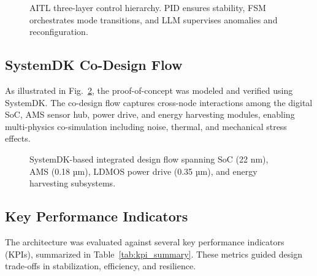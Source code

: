 \begin{figure}[t]
  \centering
  \resizebox{\columnwidth}{!}{}
  \caption{AITL three-layer control hierarchy. PID ensures stability, FSM orchestrates mode transitions, and LLM supervises anomalies and reconfiguration.}
  \label{fig:aitl_layers}
\end{figure}

\subsection{SystemDK Co-Design Flow}
As illustrated in Fig.~\ref{fig:systemdk_flow}, the proof-of-concept was modeled and verified
using SystemDK. The co-design flow captures cross-node interactions among the digital SoC,
AMS sensor hub, power drive, and energy harvesting modules, enabling multi-physics
co-simulation including noise, thermal, and mechanical stress effects.

\begin{figure}[t]
  \centering
  \caption{SystemDK-based integrated design flow spanning SoC (22 nm), AMS (0.18 µm),
  LDMOS power drive (0.35 µm), and energy harvesting subsystems.}
  \label{fig:systemdk_flow}
\end{figure}

\subsection{Key Performance Indicators}
The architecture was evaluated against several key performance indicators (KPIs),
summarized in Table~\ref{tab:kpi_summary}. These metrics guided design trade-offs
in stabilization, efficiency, and resilience.

